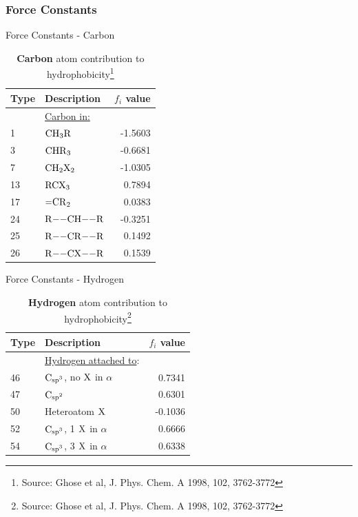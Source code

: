 \documentclass{beamer}
\begin{document}
\subsubsection{Force Constants}
\begin{frame}{Force Constants - Carbon}
    \centering
        \begin{table}[H]
            \caption{\textbf{Carbon} atom contribution to hydrophobicity\footnote{Source: Ghose et al, J. Phys. Chem. A 1998, 102, 3762-3772}}
            \begin{tabular}{l l r}
                Type & Description & $f_i$ value \\
                \hline
                & \underline{Carbon in:} &         \\
                1   & $\ce{CH_{3}R}$     & -1.5603 \\
                3   & $\ce{CHR_{3}}$     & -0.6681 \\
                7   & $\ce{CH_{2}X_{2}}$ & -1.0305 \\
                13  & $\ce{RCX_{3}}$     &  0.7894 \\
                17  & $\ce{=CR_{2}}$     &  0.0383 \\
                24  & $\ce{R--CH--R}$    & -0.3251 \\
                25  & $\ce{R--CR--R}$    &  0.1492 \\
                26  & $\ce{R--CX--R}$    &  0.1539 \\
                \hline
            \end{tabular}
        \end{table}
\end{frame}
\begin{frame}{Force Constants - Hydrogen}
    \centering
        \begin{table}[H]
            \caption{\textbf{Hydrogen} atom contribution to hydrophobicity\footnote{Source: Ghose et al, J. Phys. Chem. A 1998, 102, 3762-3772}}
            \begin{tabular}{l l r}
                Type & Description & $f_i$ value \\
                \hline
                & \underline{Hydrogen attached to}:              &         \\
                46  & $\ce{C_{sp^{3}}}$, no $\ce{X}$ in $\alpha$ &  0.7341 \\
                47  & $\ce{C_{sp^{2}}}$                          &  0.6301 \\
                50  & Heteroatom $\ce{X}$                        & -0.1036 \\
                52  & $\ce{C_{sp^{3}}}$, 1 $\ce{X}$ in $\alpha$  &  0.6666 \\
                54  & $\ce{C_{sp^{3}}}$, 3 $\ce{X}$ in $\alpha$  &  0.6338 \\
                \hline
            \end{tabular}
        \end{table}
\end{frame}
\end{document}
